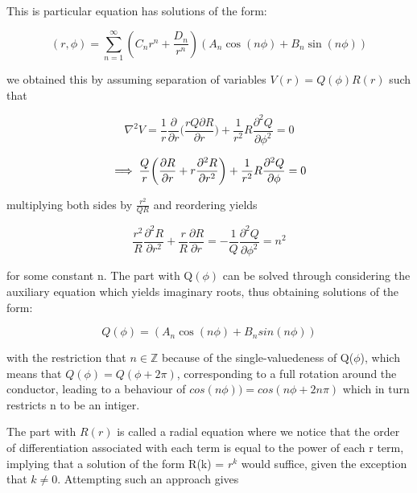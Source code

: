 \documentclass[a4paper]{article}
\begin{document}
This is particular equation has solutions of the form:

\begin{equation} \label{gensol}
(r,\phi)=\sum_{n=1}^{\infty} (C_nr^n+\frac{D_n}{r^n})(A_n \cos(n\phi)+B_n\sin(n\phi)) 
\end{equation}

we obtained this by assuming separation of variables $V(r) = Q(\phi)R(r)$ such that

\begin{equation}\nabla^2V=\frac{1}{r}\frac{\partial}{\partial r}\Big( \frac{rQ \partial R}{\partial r} \Big) + \frac{1}{r^2}R\frac{\partial^2Q}{\partial\phi^2} = 0 \end{equation}

\begin{equation}\implies \frac{Q}{r}\bigg(\frac{\partial R}{\partial r}+r\frac{\partial^2R}{\partial r^2}\bigg) + \frac{1}{r^2}R\frac{\partial^2Q}{\partial \phi} = 0 \newline\end{equation}

multiplying both sides by $\frac{r^2}{QR}$ and reordering yields

\begin{equation}\frac{r^2}{R} \frac{\partial^2R}{\partial r^2} + \frac{r}{R} \frac{\partial R}{\partial r} = - \frac{1}{Q} \frac{\partial^2Q}{\partial \phi^2} = n^2 \end{equation}

for some constant n. The part with Q$(\phi)$ can be solved through considering the auxiliary equation which yields imaginary roots, thus obtaining solutions of the form:

\begin{equation} \label{sol1}
Q(\phi) = (A_n\cos(n\phi)+B_nsin(n\phi))\end{equation}

with the restriction that $n\in \mathbb{Z}$ because of the single-valuedeness of Q($\phi$), which means that $Q(\phi) = Q(\phi+2\pi)$, corresponding to a full rotation around the conductor, leading to a behaviour of $cos(n\phi)) = cos(n\phi + 2n\pi)$ which in turn restricts n to be an intiger. \newline

The part with $R(r)$ is called a radial equation where we notice that the order of differentiation associated with each term is equal to the power of each r term, implying that a solution of the form R(k) = $r^k$ would suffice, given the exception that $k \neq 0$. Attempting such an approach gives
\end{document}
